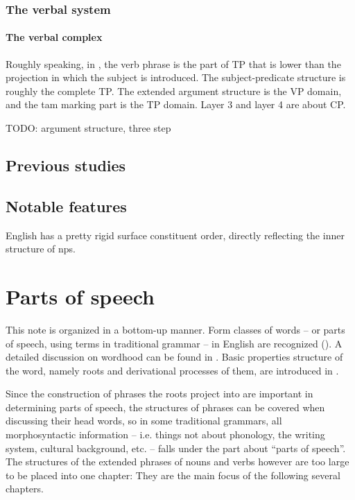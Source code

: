 \documentclass[UTF8, a4paper, oneside, scheme=plain, 12pt]{ctexbook}
\begin{document}
{\subsection{The verbal system}

\subsubsection{The verbal complex}\label{sec:vp-tp-cp}

Roughly speaking, in ,
the verb phrase is the part of TP that is lower than the projection in which the subject is introduced.
The subject-predicate structure is roughly the complete TP.
The extended argument structure is the VP domain, 
and the \acs{tam} marking part is the TP domain.
Layer 3 and layer 4 are about CP.

TODO: argument structure, three step

}

\section{Previous studies}

\section{Notable features}

English has a pretty rigid surface constituent order,
directly reflecting the inner structure of \acs{np}s.

\chapter{Parts of speech}


This note is organized in a bottom-up manner.
Form classes of words -- or parts of speech, using terms in traditional grammar -- in English
are recognized (). 
A detailed discussion on wordhood can be found in 
.
Basic properties structure of the word,
namely roots and derivational processes of them, 
are introduced in 
.



Since the construction of phrases the roots project into are important
in determining parts of speech, 
the structures of phrases can be covered when discussing their head words,
so in some traditional grammars,
all morphosyntactic information 
-- i.e. things not about phonology, the writing system, cultural background, etc. -- 
falls under the part about ``parts of speech''.
The structures of the extended phrases of nouns and verbs however are too large 
to be placed into one chapter:
They are the main focus of the following several chapters.
\end{document}
